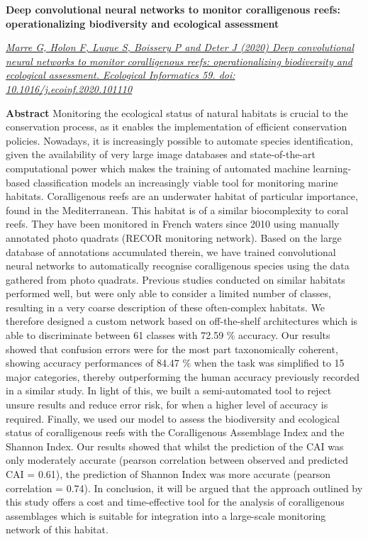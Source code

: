 \clearpage

\fontsize{14}{14}\noindent\textbf{Deep convolutional neural networks to monitor coralligenous reefs: operationalizing biodiversity and ecological assessment}

\normalsize
\medskip


\noindent\href{https://doi.org/10.1016/j.ecoinf.2020.101110}{\textit{Marre G, Holon F, Luque S, Boissery P and Deter J (2020) Deep convolutional neural networks to monitor coralligenous reefs: operationalizing biodiversity and ecological assessment. Ecological Informatics 59. doi: 10.1016/j.ecoinf.2020.101110}}

\medskip

\noindent\textbf{Abstract}
Monitoring the ecological status of natural habitats is crucial to the conservation process, as it enables the implementation of efficient conservation policies. Nowadays, it is increasingly possible to automate species identification, given the availability of very large image databases and state-of-the-art computational power which makes the training of automated machine learning-based classification models an increasingly viable tool for monitoring marine habitats. Coralligenous reefs are an underwater habitat of particular importance, found in the Mediterranean. This habitat is of a similar biocomplexity to coral reefs. They have been monitored in French waters since 2010 using manually annotated photo quadrats (RECOR monitoring network). Based on the large database of annotations accumulated therein, we have trained convolutional neural networks to automatically recognise coralligenous species using the data gathered from photo quadrats. Previous studies conducted on similar habitats performed well, but were only able to consider a limited number of classes, resulting in a very coarse description of these often-complex habitats. We therefore designed a custom network based on off-the-shelf architectures which is able to discriminate between 61 classes with 72.59 \% accuracy. Our results showed that confusion errors were for the most part taxonomically coherent, showing accuracy performances of 84.47 \% when the task was simplified to 15 major categories, thereby outperforming the human accuracy previously recorded in a similar study. In light of this, we built a semi-automated tool to reject unsure results and reduce error risk, for when a higher level of accuracy is required. Finally, we used our model to assess the biodiversity and ecological status of coralligenous reefs with the Coralligenous Assemblage Index and the Shannon Index. Our results showed that whilst the prediction of the CAI was only moderately accurate (pearson correlation between observed and predicted CAI = 0.61), the prediction of Shannon Index was more accurate (pearson correlation = 0.74). In conclusion, it will be argued that the approach outlined by this study offers a cost and time-effective tool for the analysis of coralligenous assemblages which is suitable for integration into a large-scale monitoring network of this habitat.

